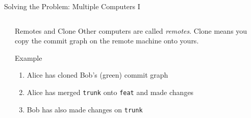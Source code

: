 \documentclass[xetex]{beamer}
\begin{document}
\begin{frame}[fragile]{Solving the Problem: Multiple Computers I}
\begin{columns}
\begin{column}{.6\linewidth}
    \end{column}
    \begin{column}{.4\linewidth}
      \begin{block}{Remotes and Clone}
        \footnotesize
        Other computers are called \emph{remotes}. Clone means you copy the
        commit graph on the remote machine onto yours.
      \end{block}
      \begin{exampleblock}{Example}
        \footnotesize
        \begin{enumerate}
          \item Alice has cloned Bob's (green) commit graph 
          \item Alice has merged \texttt{trunk} onto \texttt{feat} and made changes
          \item Bob has also made changes on \texttt{trunk}
        \end{enumerate}
      \end{exampleblock}
    \end{column}
  \end{columns}
\end{frame}
\end{document}

